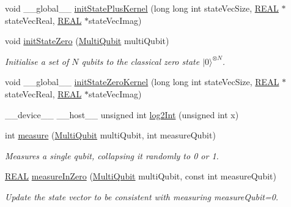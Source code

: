 \begin{DoxyCompactItemize}
void \+\_\+\+\_\+global\+\_\+\+\_\+ \mbox{\hyperlink{QuEST__env__localGPU_8cu_abddc47ea8fe014ed09dc82542bcbfe6f}{init\+State\+Plus\+Kernel}} (long long int state\+Vec\+Size, \mbox{\hyperlink{QuEST__precision_8h_a4b654506f18b8bfd61ad2a29a7e38c25}{R\+E\+AL}} $\ast$state\+Vec\+Real, \mbox{\hyperlink{QuEST__precision_8h_a4b654506f18b8bfd61ad2a29a7e38c25}{R\+E\+AL}} $\ast$state\+Vec\+Imag)
\item 
void \mbox{\hyperlink{QuEST__env__localGPU_8cu_a9ba8171c9ec5c42202b144026527e9ec}{init\+State\+Zero}} (\mbox{\hyperlink{structMultiQubit}{Multi\+Qubit}} multi\+Qubit)
\begin{DoxyCompactList}\small\item\em Initialise a set of $ N $ qubits to the classical zero state $ {| 0 \rangle}^{\otimes N} $. \end{DoxyCompactList}\item 
void \+\_\+\+\_\+global\+\_\+\+\_\+ \mbox{\hyperlink{QuEST__env__localGPU_8cu_aa6b649062c49c37ac93aac0d6be6eedd}{init\+State\+Zero\+Kernel}} (long long int state\+Vec\+Size, \mbox{\hyperlink{QuEST__precision_8h_a4b654506f18b8bfd61ad2a29a7e38c25}{R\+E\+AL}} $\ast$state\+Vec\+Real, \mbox{\hyperlink{QuEST__precision_8h_a4b654506f18b8bfd61ad2a29a7e38c25}{R\+E\+AL}} $\ast$state\+Vec\+Imag)
\item 
\+\_\+\+\_\+device\+\_\+\+\_\+ \+\_\+\+\_\+host\+\_\+\+\_\+ unsigned int \mbox{\hyperlink{QuEST__env__localGPU_8cu_a8ce1e311ea72b862a8757dc71082fbf3}{log2\+Int}} (unsigned int x)
\item 
int \mbox{\hyperlink{QuEST__env__localGPU_8cu_ad5774247d836267175c664cd0e451bcb}{measure}} (\mbox{\hyperlink{structMultiQubit}{Multi\+Qubit}} multi\+Qubit, int measure\+Qubit)
\begin{DoxyCompactList}\small\item\em Measures a single qubit, collapsing it randomly to 0 or 1. \end{DoxyCompactList}\item 
\mbox{\hyperlink{QuEST__precision_8h_a4b654506f18b8bfd61ad2a29a7e38c25}{R\+E\+AL}} \mbox{\hyperlink{QuEST__env__localGPU_8cu_a21094de735f3cb48488a184cfa4d8d41}{measure\+In\+Zero}} (\mbox{\hyperlink{structMultiQubit}{Multi\+Qubit}} multi\+Qubit, const int measure\+Qubit)
\begin{DoxyCompactList}\small\item\em Update the state vector to be consistent with measuring measure\+Qubit=0. \end{DoxyCompactList}\item 

\end{DoxyCompactItemize}
